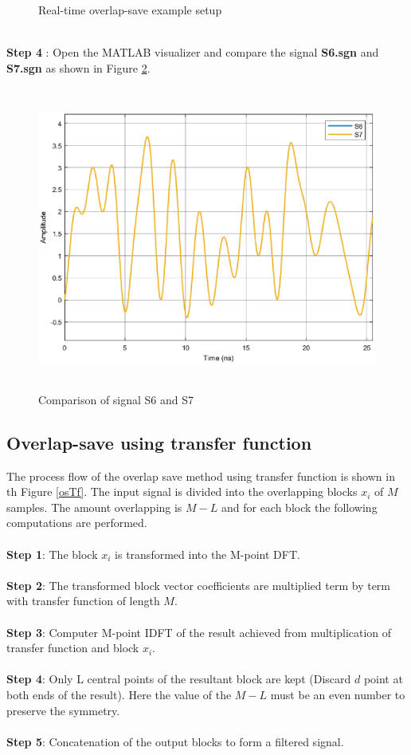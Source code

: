 \begin{refsection}
\begin{figure}[h]
	\caption{Real-time overlap-save example setup}\label{realTimeOverlapSave}
\end{figure}\\
\textbf{Step 4} : Open the MATLAB visualizer and compare the signal \textbf{S6.sgn} and \textbf{S7.sgn} as shown in Figure \ref{S6S7}.
\begin{figure}[h]
	\centering
	\includegraphics[height=10cm,width=12cm]{./algorithms/overlap_save/figures/S6_S7_ir.eps}
	\caption{Comparison of signal S6 and S7}\label{S6S7}
\end{figure}
\newpage
\subsection*{Overlap-save using transfer function}
The process flow of the overlap save method using transfer function is shown in th Figure \ref{osTf}. The input signal is divided into the overlapping blocks $x_i$ of $M$ samples. The amount overlapping is $M-L$ and for each block the following computations are performed.\\ \\
\textbf{Step 1}: The block $x_i$ is transformed into the M-point DFT.\\ \\
\textbf{Step 2}: The transformed block vector coefficients are multiplied term by term with transfer function of length $M$.\\ \\
\textbf{Step 3}: Computer M-point IDFT of the result achieved from multiplication of transfer function and block $x_i$.\\ \\
\textbf{Step 4}: Only L central points of the resultant block are kept (Discard $d$ point at both ends of the result). Here the value of the $M-L$ must be an even number to preserve the symmetry.\\ \\
\textbf{Step 5}: Concatenation of the output blocks to form a filtered signal.


\end{refsection}
